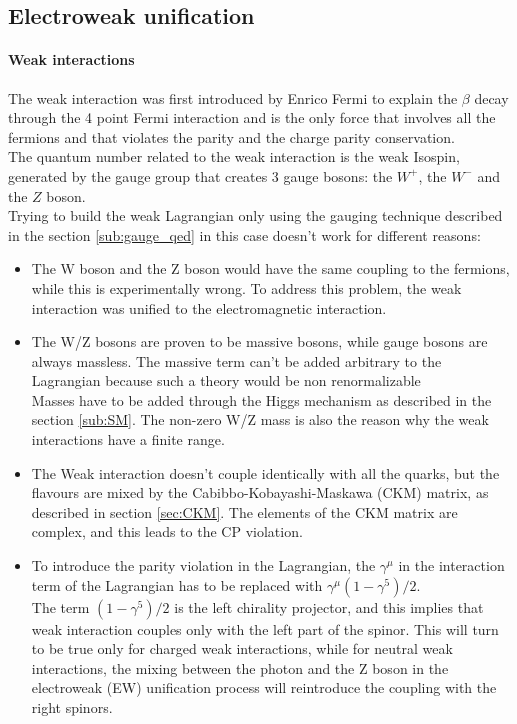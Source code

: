 \subsection{Electroweak unification}
\paragraph*{Weak interactions}
The weak interaction was first introduced by Enrico Fermi to explain the $\beta$ decay through the 4 point Fermi interaction \ADDREF and is the only force that involves all the fermions and that violates the parity and the charge parity conservation. \\
The quantum number related to the weak interaction is the weak Isospin, generated by the  gauge group that creates 3 gauge bosons: the $W^+$, the $W^-$ and the $Z$ boson.\\
Trying to build the weak Lagrangian only using the gauging technique described in the section \ref{sub:gauge_qed} in this case doesn't work for different reasons:
\begin{itemize}
    \item The W boson and the Z boson would have the same coupling to the fermions, while this is experimentally wrong. To address this problem, the weak interaction was unified to the electromagnetic interaction.
    \item The W/Z bosons are proven to be massive bosons, while gauge bosons are always massless. The massive term can't be added arbitrary to the Lagrangian because such a theory would be non renormalizable \ADDREF \\
    Masses have to be added through the Higgs mechanism as described in the section \ref{sub:SM}.
    The non-zero W/Z mass is also the reason why the weak interactions have a finite range.
    \item The Weak interaction doesn't couple identically with all the quarks, but the flavours are mixed by the Cabibbo-Kobayashi-Maskawa (CKM) matrix, \ADDREF as described in section \ref{sec:CKM}. The elements of the CKM matrix are complex, and this leads to the CP violation.
    \item To introduce the parity violation in the Lagrangian, the $\gamma^\mu$ in the interaction term of the Lagrangian has to be replaced with $\gamma^\mu \left(1-\gamma^5 \right)/2 $.\\
    The term $(1-\gamma^5)/2$ is the left chirality projector, and this implies that weak interaction couples only with the left part of the spinor. This will turn to be true only for charged weak interactions, while for neutral weak interactions, the mixing between the photon and the Z boson in the electroweak (EW) unification process will reintroduce the coupling with the right spinors.
\end{itemize}


